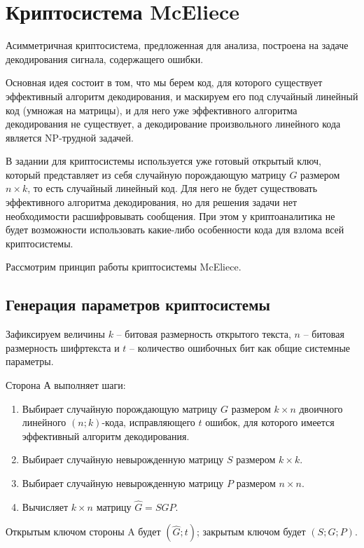 \documentclass[12pt,a4paper]{scrartcl}
\begin{document}
\section{Криптосистема McEliece}

Асимметричная криптосистема, предложенная для анализа, построена на задаче декодирования сигнала, содержащего ошибки.

Основная идея состоит в том, что мы берем код, для которого существует эффективный алгоритм декодирования, и маскируем его под случайный линейный код (умножая  на матрицы), и для него уже эффективного алгоритма декодирования не существует, а декодирование произвольного линейного кода является NP-трудной задачей.

В задании для криптосистемы используется уже готовый открытый ключ, который представляет из себя случайную порождающую матрицу $G$ размером $n \times k$, то есть случайный линейный код. Для него не будет существовать эффективного алгоритма декодирования, но для решения задачи нет необходимости расшифровывать сообщения. При этом у криптоаналитика не будет возможности использовать какие-либо особенности кода для взлома всей криптосистемы.

Рассмотрим принцип работы криптосистемы McEliece.

\subsection{Генерация параметров криптосистемы}

Зафиксируем величины $k$ -- битовая размерность открытого текста, $n$ -- битовая размерность шифртекста и $t$ -- количество ошибочных бит как общие системные параметры.

Сторона А выполняет шаги:

\begin{enumerate}
	\item Выбирает случайную порождающую матрицу $G$ размером $k \times n$ двоичного линейного $(n;k)$-кода, исправляющего $t$ ошибок, для которого имеется эффективный алгоритм декодирования.
	\item Выбирает случайную невырожденную матрицу $S$ размером $k \times k$.
	\item Выбирает случайную невырожденную матрицу $P$ размером $n \times n$.
	\item Вычисляет $k \times n$ матрицу $\hat{G} = SGP$.
\end{enumerate}

Открытым ключом стороны A будет $(\hat{G};t)$; закрытым ключом будет $(S;G;P)$.
\end{document}
